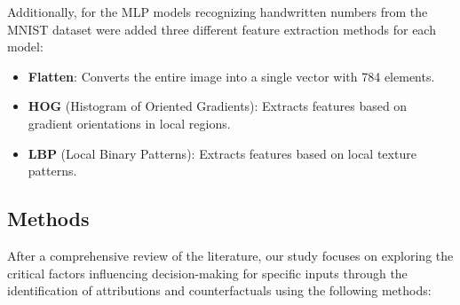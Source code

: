\documentclass[journal, a4paper]{IEEEtran}
\begin{document}
Additionally, for the MLP models recognizing handwritten numbers from the MNIST dataset were added three different feature extraction methods for each model:
\begin{itemize}
    \item \textbf{Flatten}: Converts the entire image into a single vector with 784 elements.
    \item \textbf{HOG} (Histogram of Oriented Gradients): Extracts features based on gradient orientations in local regions.
    \item \textbf{LBP} (Local Binary Patterns): Extracts features based on local texture patterns.
\end{itemize}

\subsection{Methods}\label{subsec:methods}
After a comprehensive review of the literature, our study focuses on exploring the critical factors influencing decision-making for specific inputs through the identification of attributions and counterfactuals using the following methods:
\end{document}
